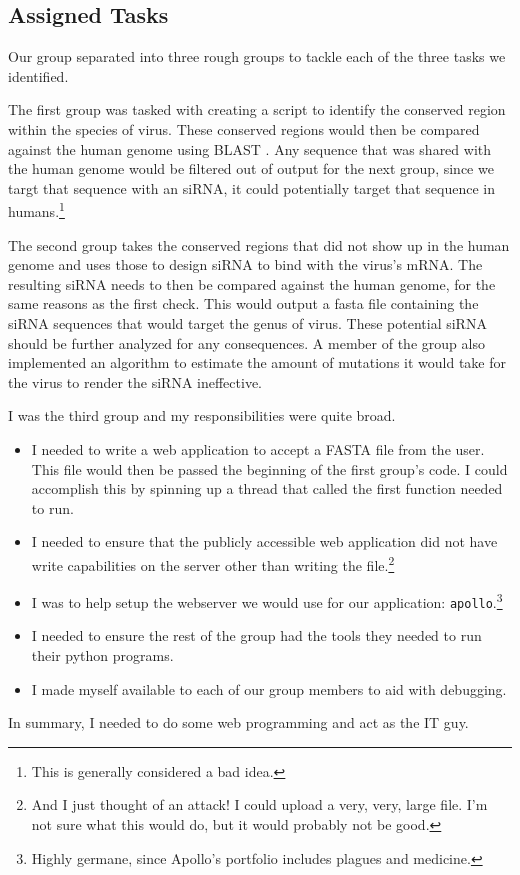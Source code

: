 \documentclass[10pt,letterpaper]{article}
\begin{document}
\subsection{Assigned Tasks}
Our group separated into three rough groups to tackle each of the three tasks we identified.

The first group was tasked with creating a script to identify the conserved region within the species of virus.
These conserved regions would then be compared against the human genome using BLAST \cite{blast}.
Any sequence that was shared with the human genome would be filtered out of output for the next group, since we targt that sequence with an siRNA, it could potentially target that sequence in humans.\footnote{This is generally considered a bad idea.}

The second group takes the conserved regions that did not show up in the human genome and uses those to design siRNA to bind with the virus's mRNA.
The resulting siRNA needs to then be compared against the human genome, for the same reasons as the first check.
This would output a fasta file containing the siRNA sequences that would target the genus of virus.
These potential siRNA should be further analyzed for any consequences.
A member of the group also implemented an algorithm to estimate the amount of mutations it would take for the virus to render the siRNA ineffective.


I was the third group and my responsibilities were quite broad.
\begin{itemize}
	\item I needed to write a web application to accept a FASTA file from the user.
	This file would then be passed the beginning of the first group's code. 
	I could accomplish this by spinning up a thread that called the first function needed to run.
	\item I needed to ensure that the publicly accessible web application did not have write capabilities on the server other than writing the file.\footnote{And I just thought of an attack!  I could upload a very, very, large file.  I'm not sure what this would do, but it would probably not be good.} 
	\item I was to help setup the webserver we would use for our application: \texttt{apollo}.\footnote{Highly germane, since Apollo's portfolio includes plagues and medicine.}
	\item I needed to ensure the rest of the group had the tools they needed to run their python programs.
	\item I made myself available to each of our group members to aid with debugging.
\end{itemize}
In summary, I needed to do some web programming and act as the IT guy.
\end{document}
